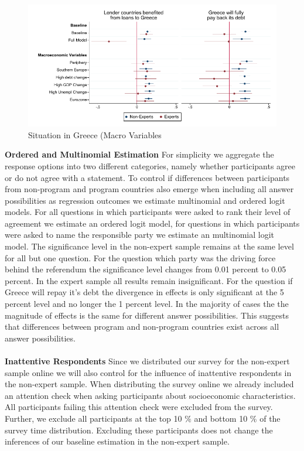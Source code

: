 \begin{figure}[h!]
    \begin{center}
     \caption{Situation in Greece (Macro Variables}
    \includegraphics[scale=1.2]{macro_S_1601_S_1701.pdf}
    \end{center}
    \tiny
\end{figure}
    \clearpage
\textbf{Ordered and Multinomial Estimation}
For simplicity we aggregate the response options into two different categories, namely whether participants agree or do not agree with a statement.  To control if differences between participants from non-program and program countries also emerge when including all answer possibilities as regression outcomes we estimate multinomial and ordered logit models. For all questions in which participants were asked to rank their level of agreement we estimate an ordered logit model, for questions in which participants were asked to name the responsible party we estimate an multinomial logit model. The significance level in the non-expert sample remains at the same level for all but one question. For the question which party was the driving force behind the referendum the significance level changes from 0.01 percent to 0.05 percent. In the expert sample all results remain insignificant. For the question if Greece will repay it's debt the divergence in effects is only significant at the 5 percent level and no longer the 1 percent level. In the majority of cases the the magnitude of effects is the same for different answer possibilities. This suggests that differences between program and non-program countries exist across all answer possibilities. \\

\\
\textbf{Inattentive Respondents}
Since we distributed our survey for the non-expert sample online we will also control for the influence of inattentive respondents in the non-expert sample. When distributing the survey online we already included an attention check when asking participants about socioeconomic characteristics. All participants failing this attention check were excluded from the survey. Further, we exclude all participants at the top 10 $\%$ and bottom 10 $\%$ of the survey time distribution. Excluding these participants does not change the inferences of our baseline estimation in the non-expert sample.\\


